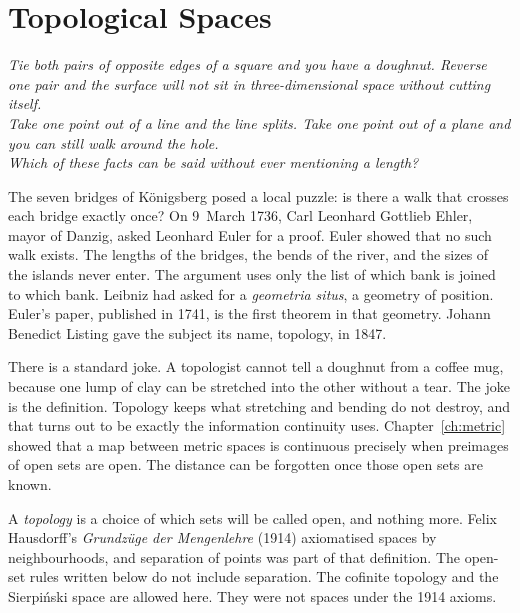 \chapter{Topological Spaces}\label{ch:topology}

\begin{center}\itshape
Tie both pairs of opposite edges of a square and you have a doughnut. Reverse one pair and the surface will not sit in three-dimensional space without cutting itself.\\
Take one point out of a line and the line splits. Take one point out of a plane and you can still walk around the hole.\\
Which of these facts can be said without ever mentioning a length?
\end{center}

The seven bridges of K\"onigsberg posed a local puzzle: is there a walk that crosses each bridge exactly once? On 9~March 1736, Carl Leonhard Gottlieb Ehler, mayor of Danzig, asked Leonhard Euler for a proof. Euler showed that no such walk exists. The lengths of the bridges, the bends of the river, and the sizes of the islands never enter. The argument uses only the list of which bank is joined to which bank. Leibniz had asked for a \emph{geometria situs}, a geometry of position. Euler's paper, published in 1741, is the first theorem in that geometry. Johann Benedict Listing gave the subject its name, topology, in 1847.

There is a standard joke. A topologist cannot tell a doughnut from a coffee mug, because one lump of clay can be stretched into the other without a tear. The joke is the definition. Topology keeps what stretching and bending do not destroy, and that turns out to be exactly the information continuity uses. Chapter~\ref{ch:metric} showed that a map between metric spaces is continuous precisely when preimages of open sets are open. The distance can be forgotten once those open sets are known.

A \emph{topology} is a choice of which sets will be called open, and nothing more. Felix Hausdorff's \emph{Grundz\"uge der Mengenlehre} (1914) axiomatised spaces by neighbourhoods, and separation of points was part of that definition. The open-set rules written below do not include separation. The cofinite topology and the Sierpi\'nski space are allowed here. They were not spaces under the 1914 axioms.


